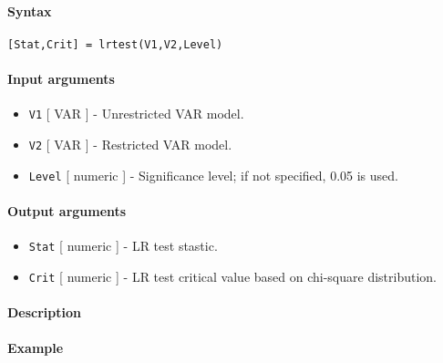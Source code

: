 


	\paragraph{Syntax}\label{syntax}

\begin{verbatim}
[Stat,Crit] = lrtest(V1,V2,Level)
\end{verbatim}

\paragraph{Input arguments}\label{input-arguments}

\begin{itemize}
\item
  \texttt{V1} {[} VAR {]} - Unrestricted VAR model.
\item
  \texttt{V2} {[} VAR {]} - Restricted VAR model.
\item
  \texttt{Level} {[} numeric {]} - Significance level; if not specified,
  0.05 is used.
\end{itemize}

\paragraph{Output arguments}\label{output-arguments}

\begin{itemize}
\item
  \texttt{Stat} {[} numeric {]} - LR test stastic.
\item
  \texttt{Crit} {[} numeric {]} - LR test critical value based on
  chi-square distribution.
\end{itemize}

\paragraph{Description}\label{description}

\paragraph{Example}\label{example}


